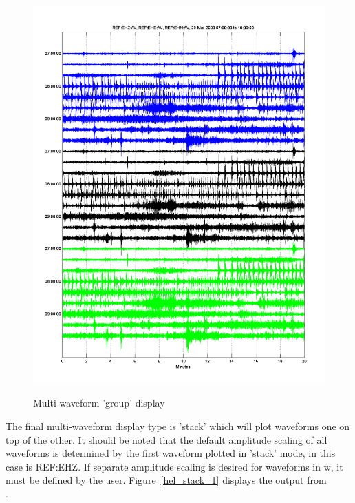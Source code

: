 \documentclass[11pt]{article}
\begin{document}
\begin{figure}[ht] 
\centerline{\scalebox{.6} {\includegraphics{hel_group_1.png}}} 
\caption{Multi-waveform 'group' display} 
\label{hel_group_1}
\end{figure}
\clearpage

The final multi-waveform display type is 'stack' which will plot waveforms one on top of the other. It should be noted that the default amplitude scaling of all waveforms is determined by the first waveform plotted in 'stack' mode, in this case  is REF:EHZ. If separate amplitude scaling is desired for waveforms in w, it must be defined by the user. Figure~\ref{hel_stack_1} displays the output from \\ .
\end{document}
